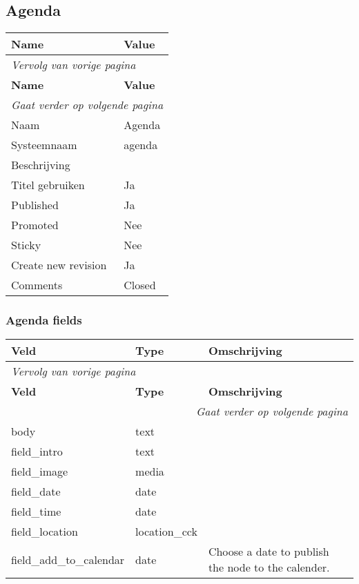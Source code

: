 \subsection{Agenda}
\label{sec:content-agenda}
  \begin{longtable}{| p{7.50cm}|p{7.50cm}|}
  \hline
  \rowcolor{tableheader}
  \textbf{Name} & \textbf{Value}  \tabularnewline
  \hline
\endfirsthead
\multicolumn{2}{l}{\textit{Vervolg van vorige pagina}} \\
\hline
\rowcolor{tableheader}
  \textbf{Name} & \textbf{Value}  \tabularnewline
  \hline
\hline
\endhead
\multicolumn{2}{r}{\textit{Gaat verder op volgende pagina}} \\
\endfoot
\hline
\endlastfoot
  Naam & Agenda  \tabularnewline
  \hline
  Systeemnaam & agenda  \tabularnewline
  \hline
  Beschrijving &   \tabularnewline
  \hline
  Titel gebruiken & Ja  \tabularnewline
  \hline
  Published & Ja  \tabularnewline
  \hline
  Promoted & Nee  \tabularnewline
  \hline
  Sticky & Nee  \tabularnewline
  \hline
  Create new revision & Ja  \tabularnewline
  \hline
  Comments & Closed  \tabularnewline
  \hline
  \end{longtable}

\subsubsection{Agenda fields}
  \begin{longtable}{| p{5.00cm}|p{5.00cm}|p{5.00cm}|}
  \hline
  \rowcolor{tableheader}
  \textbf{Veld} & \textbf{Type} & \textbf{Omschrijving}  \tabularnewline
  \hline
\endfirsthead
\multicolumn{3}{l}{\textit{Vervolg van vorige pagina}} \\
\hline
\rowcolor{tableheader}
  \textbf{Veld} & \textbf{Type} & \textbf{Omschrijving}  \tabularnewline
  \hline
\hline
\endhead
\multicolumn{3}{r}{\textit{Gaat verder op volgende pagina}} \\
\endfoot
\hline
\endlastfoot
  body & text &   \tabularnewline
  \hline
  field\_intro & text &   \tabularnewline
  \hline
  field\_image & media &   \tabularnewline
  \hline
  field\_date & date &   \tabularnewline
  \hline
  field\_time & date &   \tabularnewline
  \hline
  field\_location & location\_cck &   \tabularnewline
  \hline
  field\_add\_to\_calendar & date & Choose a date to publish the node to the calender.  \tabularnewline
  \hline
  \end{longtable}

